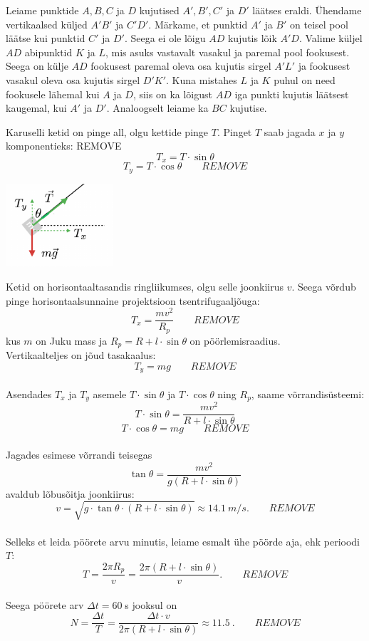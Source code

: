 \documentclass[10pt]{article}
\newcommand{\pp}[1]{REMOVE}
\begin{document}
Leiame punktide $A, B, C$ ja $D$ kujutised $A', B', C'$ ja $D'$ läätses eraldi. Ühendame vertikaalsed küljed $A'B'$ ja $C'D'$. Märkame, et punktid $A'$ ja $B'$ on teisel pool läätse kui punktid $C'$ ja $D'$. Seega ei ole lõigu $AD$ kujutis lõik $A'D$. Valime küljel $AD$ abipunktid $K$ ja $L$, mis asuks vastavalt vasakul ja paremal pool fookusest. Seega on külje $AD$ fookusest paremal oleva osa kujutis sirgel $A'L'$ ja fookusest vasakul oleva osa kujutis sirgel $D'K'$. Kuna mistahes $L$ ja $K$ puhul on need fookusele lähemal kui $A$ ja $D$, siis on ka lõigust $AD$ iga punkti kujutis läätsest kaugemal, kui $A'$ ja $D'$.
Analoogselt leiame ka $BC$ kujutise.
\probend
\bigskip

\setAuthor{}

\solu
Karuselli ketid on pinge all, olgu kettide pinge $T$. Pinget $T$ saab jagada $x$ ja $y$ komponentieks: \pp{1} 
$$T_x=T \cdot \sin{\theta}$$
$$T_y=T \cdot \cos{\theta} \qquad \pp{1} $$
 \begin{center}
\includegraphics[width=0.3\textwidth]{2020-v2g-02-yl.pdf}
\end{center}
Ketid on horisontaaltasandis ringliikumses, olgu selle joonkiirus $v$. Seega võrdub pinge horisontaalsunnaine projektsioon tsentrifugaaljõuga:
$$T_x = \frac{m v^2}{R_{p}}\quad\quad \pp{1}$$
kus $m$ on Juku mass ja $R_{p} = R + l \cdot \sin{\theta}$ on pöörlemisraadius.
\\
Vertikaalteljes on jõud tasakaalus:
$$T_y=mg \quad \quad \pp{1}$$ 
\\
Asendades $T_x$ ja $T_y$ asemele $T \cdot \sin{\theta}$ ja $T \cdot \cos{\theta}$ ning $R_{p}$, saame võrrandisüsteemi:
$$T \cdot \sin{\theta} = \frac{m v^2}{R + l \cdot \sin{\theta}}$$
$$T \cdot \cos{\theta} = mg \qquad \pp{1}$$ 
\\
Jagades esimese võrrandi teisegas
$$\tan{\theta}= \frac{mv^2}{g(R + l \cdot \sin{\theta})}$$
avaldub lõbusõitja joonkiirus:
$$v= \sqrt{g \cdot \tan{\theta} \cdot (R + l \cdot \sin{\theta})}\approx \SI{14.1}{m/s}. \qquad \pp{1}$$ 
\\
Selleks et leida pöörete arvu minutis, leiame esmalt ühe pöörde aja, ehk perioodi $T$:
$$T=\frac{2 \pi R_{p}}{v}=\frac{2 \pi (R + l \cdot \sin{\theta})}{v}. \qquad \pp{1}$$ 
\\
Seega pöörete arv  $\Delta t = 60\;$s jooksul on
$$N=\frac{\Delta t}{T} =\frac{\Delta t \cdot v}{2 \pi (R + l \cdot \sin{\theta})} \approx \SI{11.5}{}. \qquad \pp{1}$$
\probend
\bigskip
\end{document}
